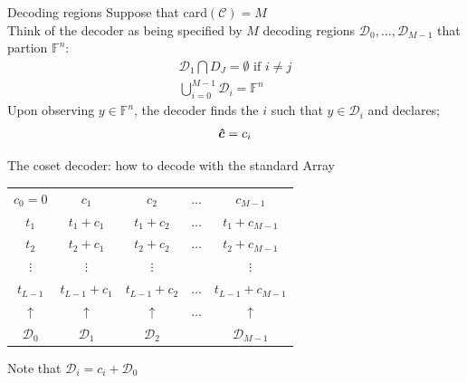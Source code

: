 \begin{parag}{Decoding regions}
    Suppose that card$\left(\mathcal{C}\right) =  M$\\
   Think of the decoder as being specified by $M$ decoding regions $\mathcal{D}_0, \ldots, \mathcal{D}_{M-1}$ that partion $\mathbb{F}^n$:
   \begin{align*} 
	   \mathcal{D}_1 \bigcap D_J =  \emptyset \text{ if } i \neq j\\
	   \bigcup_{i =  0}^{M-1} \mathcal{D}_i =  \mathbb{F}^n
   \end{align*}
   Upon observing $y \in \mathbb{F}^n$, the decoder finds the $i$ such that $y \in\mathcal{D}_i$ and declares;
   \begin{align*} \bm{\hat{c}} =  c_i \end{align*}
\end{parag}
\begin{parag}{The coset decoder: how to decode with the standard Array}
     \begin{center}
    \begin{tabular}{|ccccc}
	    $c_0 = 0$ & $c_1$ & $c_2$ & $\ldots$ & $c_{M-1}$  \\
	    $t_1$ & $t_1 + c_1$ & $t_1 + c_2$ & $\ldots$ & $t_1 +c_{M-1}$  \\
	    $t_2$ & $t_2 + c_1$ & $t_2 + c_2$ & $\ldots$ & $t_2 + c_{M-1}$ \\
	    $\vdots$ & $\vdots$ & $\vdots$ &  & $\vdots$ \\
	    $t_{L-1}$ & $t_{L-1} + c_1$ & $t_{L-1} + c_2$ & $\ldots$ & $t_{L-1} + c_{M-1}$  \\
	    \hline 
	    $\uparrow$ &$\uparrow$ &$\uparrow$ & $\ldots$ &$\uparrow$ \\
	    $\mathcal{D}_0$ &$\mathcal{D}_1$& $\mathcal{D}_2$& & $\mathcal{D}_{M-1}$ 
    \end{tabular}
    \end{center}
    Note that $\mathcal{D}_i =  c_i + \mathcal{D}_0$
\end{parag}


